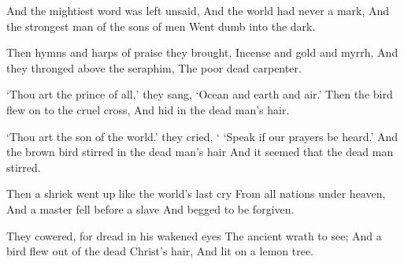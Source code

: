 \documentclass[fontsize=9, a5paper]{scrbook}
\begin{document}
\begin{poem}
	\begin{stanza}
		And the mightiest word was left unsaid,\verseline
		And the world had never a mark,\verseline
		And the strongest man of the sons of men\verseline
		Went dumb into the dark.
	\end{stanza}
	
	\begin{stanza}
		Then hymns and harps of praise they brought,\verseline
		Incense and gold and myrrh,\verseline
		And they thronged above the seraphim,\verseline
		The poor dead carpenter.
	\end{stanza}
	
	\begin{stanza}
		‘Thou art the prince of all,’ they sang,\verseline
		‘Ocean and earth and air.’\verseline
		Then the bird flew on to the cruel cross,\verseline
		And hid in the dead man’s hair.
	\end{stanza}
	
	\begin{stanza}
		‘Thou art the son of the world.’ they cried, `\verseline
		‘Speak if our prayers be heard.’\verseline
		And the brown bird stirred in the dead man’s hair\verseline
		And it seemed that the dead man stirred.
	\end{stanza}
	
	\begin{stanza}
		Then a shriek went up like the world’s last cry\verseline
		From all nations under heaven,\verseline
		And a master fell before a slave\verseline
		And begged to be forgiven.
	\end{stanza}
	
	\begin{stanza}
		They cowered, for dread in his wakened eyes\verseline
		The ancient wrath to see;\verseline
		And a bird flew out of the dead Christ’s hair,\verseline
		And lit on a lemon tree.
	\end{stanza}
\end{poem}

 
\pagebreak
\end{document}
